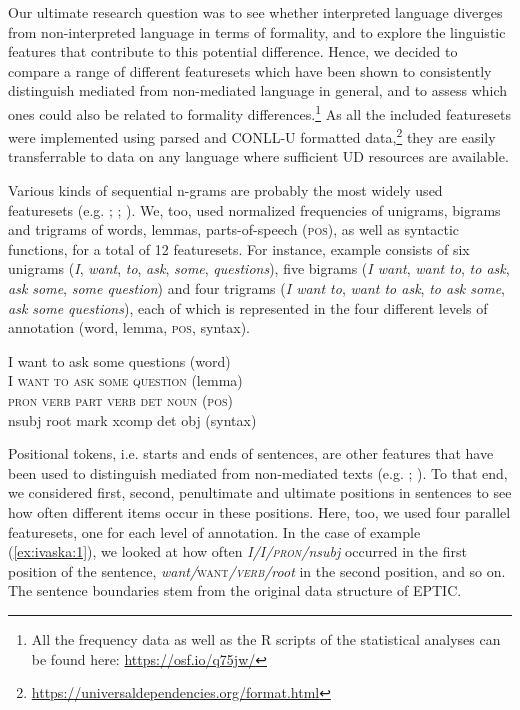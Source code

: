 \documentclass[output=paper]{langscibook}
\begin{document}
Our ultimate research question was to see whether interpreted language diverges from non-interpreted language in terms of formality, and to explore the linguistic features that contribute to this potential difference. Hence, we decided to compare a range of different featuresets which have been shown to consistently distinguish mediated from non-mediated language in general, and to assess which ones could also be related to formality differences.\footnote{All the frequency data as well as the R scripts of the statistical analyses can be found here: \url{https://osf.io/q75jw/}}  As all the included featuresets were implemented using parsed and CONLL-U formatted data,\footnote{\textsc{   }\url{https://universaldependencies.org/format.html}}  they are easily transferrable to data on any language where sufficient UD resources are available.

Various kinds of sequential n-grams are probably the most widely used featuresets (e.g. \citealt{BaroniBernardini2006}; \citealt{KoppelOrdan2011}; \citealt{VolanskyEtAl2015}). We, too, used normalized frequencies of unigrams, bigrams and trigrams of words, lemmas, parts-of-speech (\textsc{pos}), as well as syntactic functions, for a total of 12 featuresets. For instance, example  consists of six unigrams (\textit{I}, \textit{want}, \textit{to}, \textit{ask}, \textit{some}, \textit{questions}), five bigrams (\textit{I want}, \textit{want to}, \textit{to ask}, \textit{ask some}, \textit{some question}) and four trigrams (\textit{I want to}, \textit{want to ask}, \textit{to ask some}, \textit{ask some questions}), each of which is represented in the four different levels of annotation (word, lemma, \textsc{pos}, syntax).

\ea
\label{ex:ivaska:1}
\gllll I            want       to         ask         some   questions (word)\\
\textsc{I}                       \textsc{want}       \textsc{to}               \textsc{ask}               \textsc{some}      \textsc{question}  (lemma)\\
\textsc{pron}    \textsc{verb}   \textsc{part}  \textsc{verb}    \textsc{det}    \textsc{noun} (\textsc{pos})\\
nsubj      root         mark    xcomp    det        obj (syntax)\\
\z

Positional tokens, i.e. starts and ends of sentences, are other features that have been used to distinguish mediated from non-mediated texts (e.g. \citealt{VolanskyEtAl2015}; \citealt{RabinovichEtAl2016}). To that end, we considered first, second, penultimate and ultimate positions in sentences to see how often different items occur in these positions. Here, too, we used four parallel featuresets, one for each level of annotation. In the case of example (\ref{ex:ivaska:1}), we looked at how often \textit{I/I/\textsc{pron}/nsubj} occurred in the first position of the sentence, \textit{want/}\textsc{want}\textit{/\textsc{verb}/root} in the second position, and so on. The sentence boundaries stem from the original data structure of EPTIC.
\end{document}
